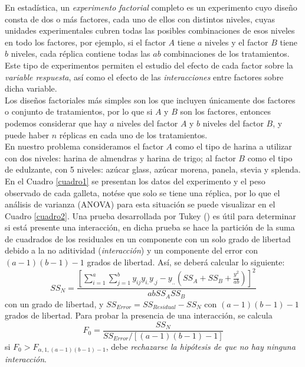 \documentclass[spanish,letterpaper,12pt]{article}
\begin{document}
En estadística, un \emph{experimento factorial} completo es un experimento cuyo diseño consta de dos o más factores, cada uno de ellos con distintos niveles, cuyas unidades experimentales cubren todas las posibles combinaciones de esos niveles en todo los factores, por ejemplo, si el factor $A$ tiene $a$ niveles y el factor $B$ tiene $b$ niveles, cada réplica contiene todas las $ab$ combinaciones de los tratamientos. Este tipo de experimentos permiten el estudio del efecto de cada factor sobre la \emph{variable respuesta}, así como el efecto de las \emph{interacciones} entre factores sobre dicha variable.\\

Los diseños factoriales más simples son los que incluyen únicamente dos factores o conjunto de tratamientos, por lo que si $A$ y $B$ son los factores, entonces podemos considerar que hay $a$ niveles del factor $A$ y $b$ niveles del factor $B$, y puede haber $n$ réplicas en cada uno de los tratamientos.\\

En nuestro problema consideramos el factor $A$ como el tipo de harina a utilizar con dos niveles: harina de almendras y harina de trigo; al factor $B$ como el tipo de edulzante, con 5 niveles: azúcar glass, azúcar morena, panela, stevia y splenda. En el Cuadro \ref{cuadro1} se presentan los datos del experimento y el peso observado de cada galleta, notése que solo se tiene una réplica, por lo que el análisis de varianza (ANOVA) para esta situación se puede visualizar en el Cuadro \ref{cuadro2}. Una prueba desarrollada por Tukey (\citet{montgomery2003}) es útil para determinar si está presente una interacción, en dicha prueba se hace la partición de la suma de cuadrados de los residuales en un componente con un solo grado de libertad debido a la no aditividad (\emph{interacción}) y un componente del error con $(a-1)(b-1)-1$ grados de libertad. Así, se deberá calcular lo siguiente:
\begin{equation*}
  SS_N = \frac{\left[\sum_{i=1}^{a} \sum_{j=1}^{b} y_{ij}y_{i.}y_{.j} - y_{..}\left(SS_A + SS_B + \frac{y^2_{..}}{ab}\right)\right]^2}{abSS_A SS_B}
\end{equation*}
\noindent con un grado de libertad, y $SS_{Error} = SS_{Residual} - SS_N$ con $(a-1)(b-1)-1$ grados de libertad. Para probar la presencia de una interacción, se calcula
\begin{equation*}
  F_0 = \frac{SS_N}{SS_{Error} / [(a-1)(b-1)-1]}
\end{equation*}
\noindent si $F_0 > F_{\alpha,1,(a-1)(b-1)-1}$, debe \emph{rechazarse la hipótesis de que no hay ninguna interacción}.
\end{document}
